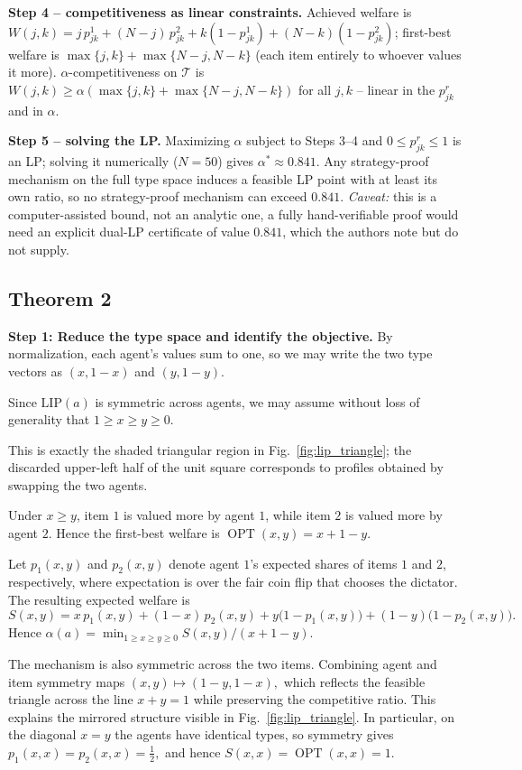 \documentclass{article}
\DeclareMathOperator{\OPT}{OPT}
\begin{document}
\textbf{Step 4 -- competitiveness as linear constraints.}
Achieved welfare is $W(j,k)=j\,p^1_{jk}+(N-j)\,p^2_{jk}+k(1-p^1_{jk})+(N-k)(1-p^2_{jk})$;
first-best welfare is $\max\{j,k\}+\max\{N-j,N-k\}$ (each item entirely to
whoever values it more). $\alpha$-competitiveness on $\mathcal T$ is
$W(j,k)\ge\alpha(\max\{j,k\}+\max\{N-j,N-k\})$ for all $j,k$ -- linear in the
$p^r_{jk}$ and in $\alpha$.

\textbf{Step 5 -- solving the LP.} Maximizing $\alpha$ subject to Steps 3--4
and $0\le p^r_{jk}\le1$ is an LP; solving it numerically ($N=50$) gives
$\alpha^*\approx0.841$. Any strategy-proof mechanism on the full type space
induces a feasible LP point with at least its own ratio, so no strategy-proof
mechanism can exceed $0.841$. \emph{Caveat:} this is a computer-assisted
bound, not an analytic one, a fully hand-verifiable proof would need an
explicit dual-LP certificate of value $0.841$, which the authors note but do
not supply.

\subsection{Theorem 2}
\textbf{Step 1: Reduce the type space and identify the objective.}
By normalization, each agent's values sum to one, so we may write the two type vectors as $(x,1-x)$ and $(y,1-y).$

Since $\mathrm{LIP}(a)$ is symmetric across agents, we may assume without loss of generality that $1\ge x\ge y\ge 0.$

This is exactly the shaded triangular region in Fig.~\ref{fig:lip_triangle}; the discarded upper-left half of the unit square corresponds to profiles obtained by swapping the two agents.

Under $x\ge y$, item $1$ is valued more by agent $1$, while item $2$ is valued
more by agent $2$. Hence the first-best welfare is $\OPT(x,y)=x+1-y.$

Let $p_1(x,y)$ and $p_2(x,y)$ denote agent $1$'s expected shares of items $1$ and $2$, respectively, where expectation is over the fair coin flip that chooses the dictator. The resulting expected welfare is
\[
S(x,y)
=x\,p_1(x,y)+(1-x)\,p_2(x,y)
+y\bigl(1-p_1(x,y)\bigr)
+(1-y)\bigl(1-p_2(x,y)\bigr).
\]
Hence $\alpha(a)
= \min_{1\ge x\ge y\ge0} {S(x,y)}/({x+1-y}).$

The mechanism is also symmetric across the two items. Combining agent and item symmetry maps $(x,y)\mapsto(1-y,1-x),$ which reflects the feasible triangle across the line $x+y=1$ while preserving the competitive ratio. This explains the mirrored structure visible in Fig.~\ref{fig:lip_triangle}. In particular, on the diagonal $x=y$ the agents
have identical types, so symmetry gives $p_1(x,x)=p_2(x,x)=\frac12,$ and hence $S(x,x)=\OPT(x,x)=1.$
\end{document}
